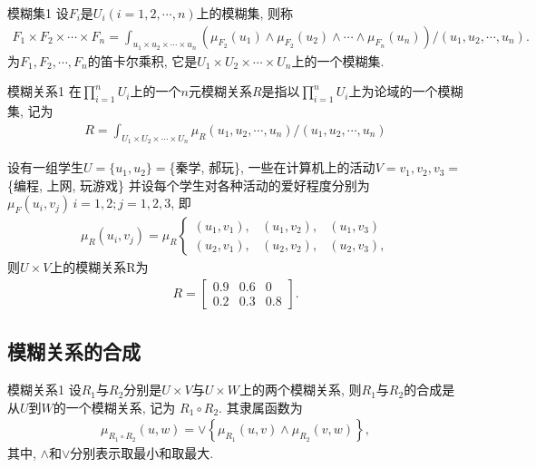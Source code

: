 \begin{mydef}{模糊集}{1}
设$F_i$是$U_i(i=1,2,\cdots,n)$上的模糊集, 则称
 \begin{align}
   F_{1} \times F_{2} \times \cdots \times F_{n}=
    \int_{u_{1} \times u_{2} \times \cdots \times u_{n}}\left(\mu_{F_{2}}(u_{1}) \wedge \mu_{F_{2}}\left(u_{2}\right)
    \wedge \cdots \wedge \mu_{F_{n}}\left(u_{n}\right)\right) /\left(u_{1}, u_{2}, \cdots, u_{n}\right).
 \end{align}
为$F_1,F_2,\cdots,F_n$的笛卡尔乘积, 它是$U_1\times U_2\times\cdots\times U_n$上的一个模糊集.
\end{mydef}
\begin{mydef}{模糊关系}{1}
    在$\prod_{i=1}^n U_i$上的一个$n$元模糊关系$R$是指以$\prod_{i=1}^n U_i$上为论域的一个模糊集, 记为
\begin{align}
    R=\int_{U_1\times U_2\times\cdots\times U_n} \mu_{R}\left(u_{1}, u_{2}, \cdots, u_{n}\right) /\left(u_{1}, u_{2}, \cdots, u_{n}\right)
\end{align}
\end{mydef}

\begin{example}
设有一组学生$U=\{u_1,u_2\}=$\{秦学, 郝玩\}, 一些在计算机上的活动$V={v_1,v_2,v_3}=$\{编程, 上网, 玩游戏\}
并设每个学生对各种活动的爱好程度分别为 $\mu_{F}\left(u_{i}, v_{j}\right)\, i=1,2; j=1,2,3$, 即
\begin{align}
  \mu_{R}(u_i,v_j)=
  \mu_{R}
  \left\{
  \begin{array}{llll}
    (u_1,v_1),&(u_1,v_2),&(u_1,v_3)\\
    (u_2,v_1),&(u_2,v_2),&(u_2,v_3),
  \end{array}
  \right.
\end{align}
则$U\times V$上的模糊关系R为
\begin{align}
    R=\left[\begin{array}{lll}{0.9} & {0.6} & {0} \\ {0.2} & {0.3} & {0.8}\end{array}\right].
\end{align}
\end{example}
\subsection{模糊关系的合成}
\begin{mydef}{模糊关系}{1}
    设$R_1$与$R_2$分别是$U\times V$与$U\times W$上的两个模糊关系, 则$R_1$与$R_2$的合成是从$U$到$W$的一个模糊关系, 记为   $R_1\circ R_2$. 其隶属函数为
\begin{align}
  \mu_{R_{1}\circ R_{2}}(u, w)=\vee\left\{\mu_{R_{1}}(u, v) \wedge \mu_{R_{2}}(v, w)\right\},
\end{align}
其中, $\wedge$和$\vee$分别表示取最小和取最大.
\end{mydef}

